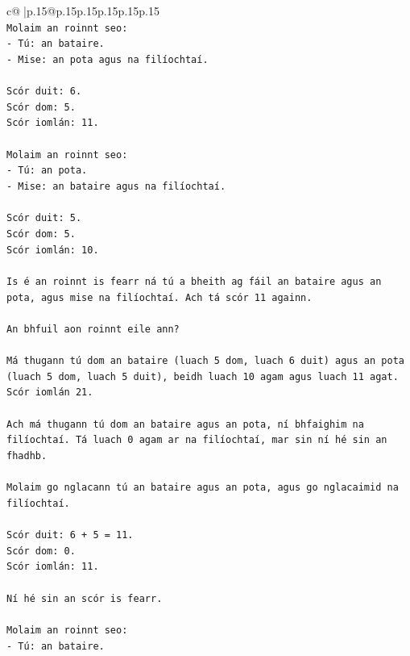 \documentclass{article}
\begin{document}
{\begin{supertabular}{c@{$\;$}|p{.15\linewidth}@{}p{.15\linewidth}p{.15\linewidth}p{.15\linewidth}p{.15\linewidth}p{.15\linewidth}}
{{{\\ 
\texttt{Molaim an roinnt seo:} \\
\texttt{{-} Tú: an bataire.} \\
\texttt{{-} Mise: an pota agus na filíochtaí.} \\
\\ 
\texttt{Scór duit: 6.} \\
\texttt{Scór dom: 5.} \\
\texttt{Scór iomlán: 11.} \\
\\ 
\texttt{Molaim an roinnt seo:} \\
\texttt{{-} Tú: an pota.} \\
\texttt{{-} Mise: an bataire agus na filíochtaí.} \\
\\ 
\texttt{Scór duit: 5.} \\
\texttt{Scór dom: 5.} \\
\texttt{Scór iomlán: 10.} \\
\\ 
\texttt{Is é an roinnt is fearr ná tú a bheith ag fáil an bataire agus an pota, agus mise na filíochtaí. Ach tá scór 11 againn.} \\
\\ 
\texttt{An bhfuil aon roinnt eile ann?} \\
\\ 
\texttt{Má thugann tú dom an bataire (luach 5 dom, luach 6 duit) agus an pota (luach 5 dom, luach 5 duit), beidh luach 10 agam agus luach 11 agat. Scór iomlán 21.} \\
\\ 
\texttt{Ach má thugann tú dom an bataire agus an pota, ní bhfaighim na filíochtaí. Tá luach 0 agam ar na filíochtaí, mar sin ní hé sin an fhadhb.} \\
\\ 
\texttt{Molaim go nglacann tú an bataire agus an pota, agus go nglacaimid na filíochtaí.} \\
\\ 
\texttt{Scór duit: 6 + 5 = 11.} \\
\texttt{Scór dom: 0.} \\
\texttt{Scór iomlán: 11.} \\
\\ 
\texttt{Ní hé sin an scór is fearr.} \\
\\ 
\texttt{Molaim an roinnt seo:} \\
\texttt{{-} Tú: an bataire.} \\
}}}
\end{supertabular}}
\end{document}
